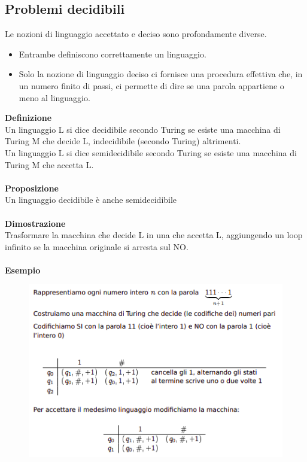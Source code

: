 \subsection{Problemi decidibili}
Le nozioni di linguaggio accettato e deciso sono profondamente diverse.
\begin{itemize}
    \item Entrambe definiscono correttamente un linguaggio.
    
    \item Solo la nozione di linguaggio deciso ci fornisce una procedura effettiva che, in un numero finito di passi, ci permette di dire se una parola appartiene o meno al linguaggio.
\end{itemize}
\textbf{Definizione}\\
Un linguaggio L si dice decidibile secondo Turing se esiste una macchina di Turing M che decide L, indecidibile (secondo Turing) altrimenti.\\
Un linguaggio L si dice semidecidibile secondo Turing se esiste una macchina di Turing M che accetta L.\\\\
\textbf{Proposizione}\\
Un linguaggio decidibile è anche semidecidibile\\\\
\textbf{Dimostrazione}\\
Trasformare la macchina che decide L in una che accetta L, aggiungendo un loop infinito se la macchina originale si arresta sul NO.\\\\
\textbf{Esempio}
\begin{figure}[htp]
    \centering
     \includegraphics[scale=0.9]{tesi_stile/img/esempio.png}
\end{figure}
